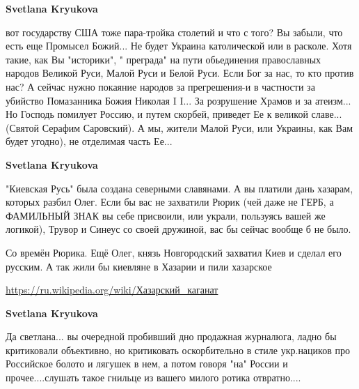 \begin{itemize}
\begin{itemize}
\textbf{Svetlana Kryukova} 

вот государству США тоже пара-тройка столетий и что с того?
Вы забыли, что есть еще Промысел Божий... Не будет Украина католической или в
расколе. Хотя такие, как Вы "историки", " преграда" на пути обьединения
православных народов Великой Руси, Малой Руси и Белой Руси. Если Бог за нас, то
кто против нас? А сейчас нужно покаяние народов за прегрешения-и в частности за
убийство Помазанника Божия Николая I I... За розрушение Храмов и за атеизм...
Но Господь помилует Россию, и путем скорбей, приведет Ее к великой славе...
(Святой Серафим Саровский). А мы, жители Малой Руси, или Украины, как Вам будет
угодно), не отделимая часть Ее...


 
\textbf{Svetlana Kryukova} 

"Киевская Русь" была создана северными славянами. А вы платили дань хазарам,
которых разбил Олег. Если бы вас не захватили Рюрик (чей даже не ГЕРБ, а
ФАМИЛЬНЫЙ ЗНАК вы себе присвоили, или украли, пользуясь вашей же логикой),
Трувор и Синеус со своей дружиной, вас бы сейчас вообще б не было.

Со времён Рюрика. Ещё Олег, князь Новгородский захватил Киев и сделал его
русским. А так жили бы киевляне в Хазарии и пили хазарское

\url{https://ru.wikipedia.org/wiki/Хазарский_каганат}

 
\textbf{Svetlana Kryukova} 

Да светлана... вы очередной пробивший дно продажная журналюга, ладно бы
критиковали объективно, но критиковать оскорбительно в стиле укр.нациков про
Российское болото и лягушек в нем, а потом говоря "на" России и
прочее....слушать такое гнильце из вашего милого ротика отвратно....


 

\end{itemize}
\end{itemize}
